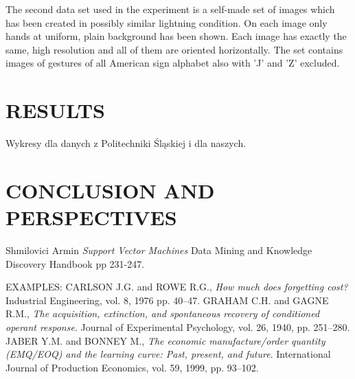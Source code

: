 \documentclass[11pt,a4paper]{article}
\begin{document}
	The second data set used in the experiment is a self-made set of images which has been created in possibly similar lightning condition. On each image only hands at uniform, plain background has been shown. Each image has exactly the same, high resolution and all of them are oriented horizontally. The set contains images of gestures of all American sign alphabet also with 'J' and 'Z' excluded.



\section{RESULTS}

Wykresy dla danych z Politechniki Śląskiej i dla naszych.



\section{CONCLUSION AND PERSPECTIVES}




\begin{thebibliography}{99}
 \setlength\baselineskip{5pt}
%
 Shmilovici Armin \textit{Support Vector Machines} Data Mining and Knowledge Discovery Handbook pp 231-247.




EXAMPLES:
 CARLSON J.G. and ROWE R.G., \textit{How much does forgetting cost?} Industrial Engineering, vol. 8, 1976 pp. 40--47.
 GRAHAM C.H. and  GAGNE R.M., \textit{The acquisition, extinction, and spontaneous recovery of conditioned operant response}. Journal of Experimental Psychology, vol. 26, 1940, pp. 251--280.
 JABER Y.M. and BONNEY M., \textit{The economic manufacture/order quantity (EMQ/EOQ) and the learning curve: Past, present, and future}. International Journal of Production Economics, vol. 59, 1999, pp. 93--102.


\end{thebibliography}
\end{document}
